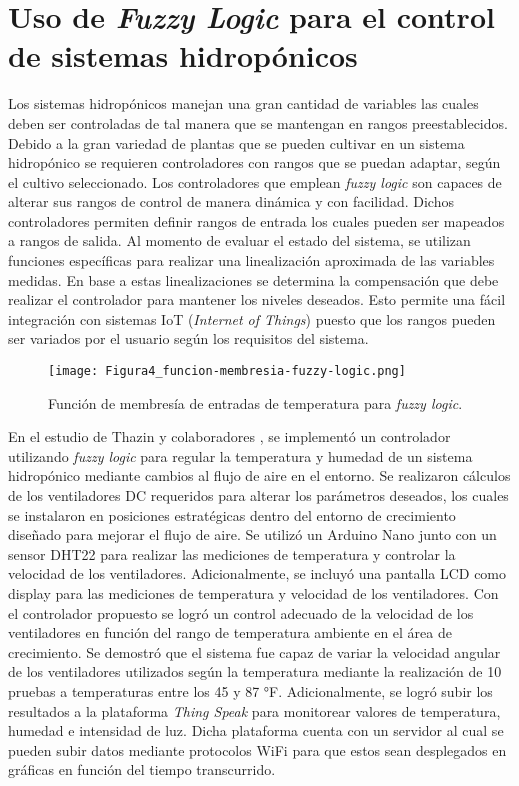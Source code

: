 \section{Uso de \textit{Fuzzy Logic} para el control de sistemas hidropónicos}
Los sistemas hidropónicos manejan una gran cantidad de variables las cuales deben ser controladas de tal manera que se mantengan en rangos preestablecidos. Debido a la gran variedad de plantas que se pueden cultivar en un sistema hidropónico se requieren controladores con rangos que se puedan adaptar, según el cultivo seleccionado. Los controladores que emplean \textit{fuzzy logic} son capaces de alterar sus rangos de control de manera dinámica y con facilidad. Dichos controladores permiten definir rangos de entrada los cuales pueden ser mapeados a rangos de salida. Al momento de evaluar el estado del sistema, se utilizan funciones específicas para realizar una linealización aproximada de las variables medidas. En base a estas linealizaciones se determina la compensación que debe realizar el controlador para mantener los niveles deseados. Esto permite una fácil integración con sistemas IoT (\textit{Internet of Things}) puesto que los rangos pueden ser variados por el usuario según los requisitos del sistema.

\begin{figure}[H]
	\centering
	\texttt{[image: Figura4\_funcion-membresia-fuzzy-logic.png]}
	\caption{Función de membresía de entradas de temperatura para \textit{fuzzy logic}. \cite{thazin_iot_2019}}
	\label{fig:mesh3}
\end{figure}

\indent En el estudio de Thazin y colaboradores \cite{thazin_iot_2019}, se implementó un controlador utilizando \textit{fuzzy logic} para regular la temperatura y humedad de un sistema hidropónico mediante cambios al flujo de aire en el entorno. Se realizaron cálculos de los ventiladores DC requeridos para alterar los parámetros deseados, los cuales se instalaron en posiciones estratégicas dentro del entorno de crecimiento diseñado para mejorar el flujo de aire. Se utilizó un Arduino Nano junto con un sensor DHT22 para realizar las mediciones de temperatura y controlar la velocidad de los ventiladores. Adicionalmente, se incluyó una pantalla LCD como display para las mediciones de temperatura y velocidad de los ventiladores. Con el controlador propuesto se logró un control adecuado de la velocidad de los ventiladores en función del rango de temperatura ambiente en el área de crecimiento. Se demostró que el sistema fue capaz de variar la velocidad angular de los ventiladores utilizados según la temperatura mediante la realización de 10 pruebas a temperaturas entre los 45 y 87 °F. Adicionalmente, se logró subir los resultados a la plataforma \textit{Thing Speak} para monitorear valores de temperatura, humedad e intensidad de luz. Dicha plataforma cuenta con un servidor al cual se pueden subir datos mediante protocolos WiFi para que estos sean desplegados en gráficas en función del tiempo transcurrido.

